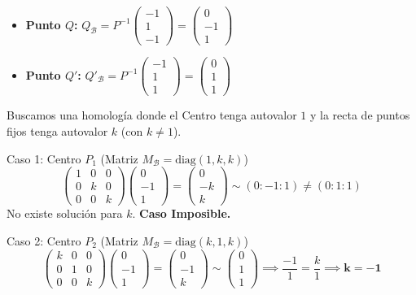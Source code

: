 {\begin{itemize}
    \item \textbf{Punto $Q$:} $Q_{\mathcal{B}} = P^{-1} \begin{pmatrix} -1 \\ 1 \\ -1 \end{pmatrix} = \begin{pmatrix} 0 \\ -1 \\ 1 \end{pmatrix}$
    \item \textbf{Punto $Q'$:} $Q'_{\mathcal{B}} = P^{-1} \begin{pmatrix} -1 \\ 1 \\ 1 \end{pmatrix} = \begin{pmatrix} 0 \\ 1 \\ 1 \end{pmatrix}$
\end{itemize}


Buscamos una homología donde el Centro tenga autovalor $1$ y la recta de puntos fijos tenga autovalor $k$ (con $k \neq 1$).

Caso 1: Centro $P_1$ (Matriz $M_{\mathcal{B}} = \text{diag}(1, k, k)$)
$$ \begin{pmatrix} 1 & 0 & 0 \\ 0 & k & 0 \\ 0 & 0 & k \end{pmatrix} \begin{pmatrix} 0 \\ -1 \\ 1 \end{pmatrix} = \begin{pmatrix} 0 \\ -k \\ k \end{pmatrix} \sim (0:-1:1) \neq (0:1:1) $$
No existe solución para $k$. \textbf{Caso Imposible.}

Caso 2: Centro $P_2$ (Matriz $M_{\mathcal{B}} = \text{diag}(k, 1, k)$)
$$ \begin{pmatrix} k & 0 & 0 \\ 0 & 1 & 0 \\ 0 & 0 & k \end{pmatrix} \begin{pmatrix} 0 \\ -1 \\ 1 \end{pmatrix} = \begin{pmatrix} 0 \\ -1 \\ k \end{pmatrix} \sim \begin{pmatrix} 0 \\ 1 \\ 1 \end{pmatrix} \implies \frac{-1}{1} = \frac{k}{1} \implies \mathbf{k = -1} $$

}
